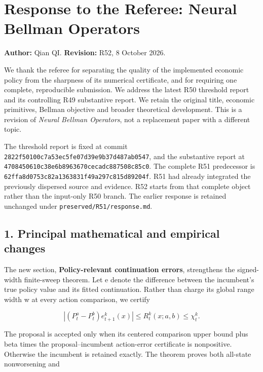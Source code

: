 \hypertarget{response-to-the-referee-neural-bellman-operators}{%
\section{Response to the Referee: Neural Bellman
Operators}\label{response-to-the-referee-neural-bellman-operators}}

\textbf{Author:} Qian QI. \textbf{Revision:} R52, 8 October 2026.

We thank the referee for separating the quality of the implemented
economic policy from the sharpness of its numerical certificate, and for
requiring one complete, reproducible submission. We address the latest
R50 threshold report and its controlling R49 substantive report. We
retain the original title, economic primitives, Bellman objective and
broader theoretical development. This is a revision of \emph{Neural
Bellman Operators}, not a replacement paper with a different topic.

The threshold report is fixed at commit
\texttt{2822f50100c7a53ec5fe07d39e9b37d487ab0547}, and the substantive
report at \texttt{4708450610c38e6b8963670cecadc887508c85c0}. The
complete R51 predecessor is
\texttt{62ffa8d0753c82a1363831f49a297c815d89204f}. R51 had already
integrated the previously dispersed source and evidence. R52 starts from
that complete object rather than the input-only R50 branch. The earlier
response is retained unchanged under \texttt{preserved/R51/response.md}.

\hypertarget{principal-mathematical-and-empirical-changes}{%
\subsection{1. Principal mathematical and empirical
changes}\label{principal-mathematical-and-empirical-changes}}

The new section, \textbf{Policy-relevant continuation errors},
strengthens the signed-width finite-sweep theorem. Let e denote the
difference between the incumbent's true policy value and its fitted
continuation. Rather than charge its global range width w at every
action comparison, we certify

\[
 |(P_t^a-P_t^b)e_{t+1}^k(x)|\le R_t^k(x;a,b)\le\chi_t^k.
\]

The proposal is accepted only when its centered comparison upper bound
plus beta times the proposal--incumbent action-error certificate is
nonpositive. Otherwise the incumbent is retained exactly. The theorem
proves both all-state nonworsening and

